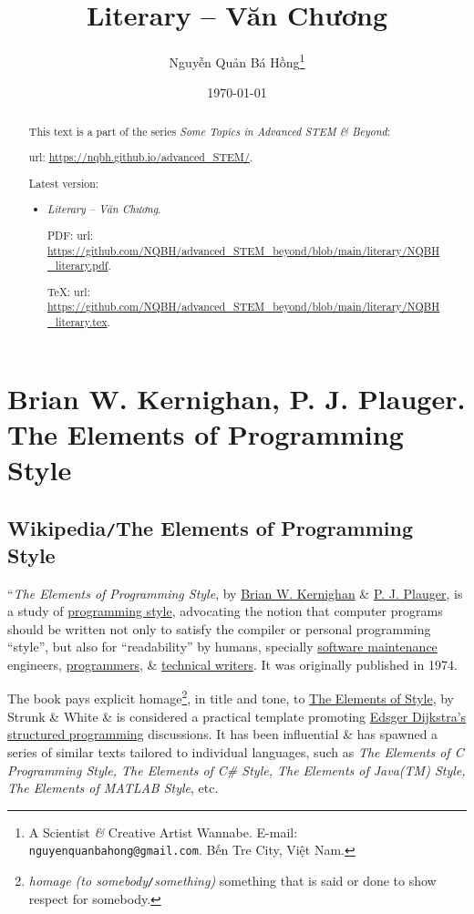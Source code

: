 \documentclass{article}
\title{Literary -- Văn Chương}
\author{Nguyễn Quản Bá Hồng\footnote{A Scientist {\it\&} Creative Artist Wannabe. E-mail: {\tt nguyenquanbahong@gmail.com}. Bến Tre City, Việt Nam.}}
\date{\today}
\begin{document}
\maketitle
\begin{abstract}
	This text is a part of the series {\it Some Topics in Advanced STEM \& Beyond}:
	
	{\sc url}: \url{https://nqbh.github.io/advanced_STEM/}.
	
	Latest version:
	\begin{itemize}
		\item {\it Literary -- Văn Chương}.
		
		PDF: {\sc url}: \url{https://github.com/NQBH/advanced_STEM_beyond/blob/main/literary/NQBH_literary.pdf}.
		
		\TeX: {\sc url}: \url{https://github.com/NQBH/advanced_STEM_beyond/blob/main/literary/NQBH_literary.tex}.
	\end{itemize}
\end{abstract}
\tableofcontents


\section{{\sc Brian W. Kernighan, P. J. Plauger}. The Elements of Programming Style}

\subsection{Wikipedia{\tt/}The Elements of Programming Style}
``{\it The Elements of Programming Style}, by \href{https://en.wikipedia.org/wiki/Brian_W._Kernighan}{Brian W. Kernighan} \& \href{https://en.wikipedia.org/wiki/P._J._Plauger}{P. J. Plauger}, is a study of \href{https://en.wikipedia.org/wiki/Programming_style}{programming style}, advocating the notion that computer programs should be written not only to satisfy the compiler or personal programming ``style'', but also for ``readability'' by humans, specially \href{https://en.wikipedia.org/wiki/Software_maintenance}{software maintenance} engineers, \href{https://en.wikipedia.org/wiki/Programmers}{programmers}, \& \href{https://en.wikipedia.org/wiki/Technical_writers}{technical writers}. It was originally published in 1974.

The book pays explicit homage\footnote{{\it homage (to somebody{\tt/}something)} something that is said or done to show respect for somebody.}, in title and tone, to \href{https://en.wikipedia.org/wiki/The_Elements_of_Style}{The Elements of Style}, by Strunk \& White \& is considered a practical template promoting \href{https://en.wikipedia.org/wiki/Edsger_Dijkstra}{Edsger Dijkstra's structured programming} discussions. It has been influential \& has spawned a series of similar texts tailored to individual languages, such as {\it The Elements of C Programming Style, The Elements of C\# Style, The Elements of Java(TM) Style, The Elements of MATLAB Style}, etc.
\end{document}
